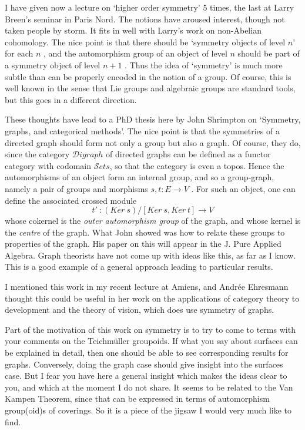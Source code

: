 \documentclass[11pt]{article}
\begin{document}
I have given now a lecture on `higher order symmetry' 5 times, the last
at Larry Breen's seminar in Paris Nord. The notions have aroused interest,
though not taken people by storm. It fits in well with Larry's work on
non-Abelian cohomology. The nice point is that there should be `symmetry
objects of level $n$' for each $n$ , and the automorphism group of an object
of level $n$ should be part of a symmetry object of level $n+1$ . Thus the
idea of `symmetry' is much more subtle than can be properly encoded in the
notion of a group. Of course, this is well known in the sense that Lie
groups and algebraic groups are standard tools, but this goes in a different
direction.

These thoughts have lead to a PhD thesis here by John Shrimpton on
`Symmetry, graphs, and categorical methods'. The nice point is that the
symmetries of a directed graph should form not only a group but also a
graph. Of course, they do, since the category $\mathcal{D}igraph$ of directed graphs
can be defined as a functor category with codomain $\mathcal{S}ets$, so that the
category is even a topos. Hence the automorphisms of an object form an
internal group, and so a group-graph, namely a pair of groups and morphisms
$s,t : E \longrightarrow V$ . For such an object, one can define the associated crossed
module
\[ t' \ : (Ker\ s)/[Ker\ s,Ker\ t] \longrightarrow V \]
whose cokernel is the \textit{outer automorphism group} of the graph, and whose
kernel is the \textit{centre} of the graph. What John showed was how to relate these
groups to properties of the graph. His paper on this will appear in the J.
Pure Applied Algebra. Graph theorists have not come up with ideas like
this, as far as I know. This is a good example of a general approach
leading to particular results.

I mentioned this work in my recent lecture at Amiens, and Andrée
Ehresmann thought this could be useful in her work on the applications of
category theory to development and the theory of vision, which does use
symmetry of graphs.

Part of the motivation of this work on symmetry is to try to come to
terms with your comments on the Teichmüller groupoids. If what you say
about surfaces can be explained in detail, then one should be able to see
corresponding results for graphs. Conversely, doing the graph case should
give insight into the surfaces case. But I fear you have here a general
insight which makes the ideas clear to you, and which at the moment I do not
share. It seems to be related to the Van Kampen Theorem, since that can be
expressed in terms of automorphism group(oid)s of coverings. So it is a
piece of the jigsaw I would very much like to find.
\end{document}
